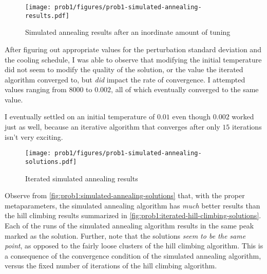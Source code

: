 \documentclass{article}
\begin{document}
\begin{figure}[H]
    \centering
    \texttt{[image: prob1/figures/prob1-simulated-annealing-results.pdf]}
    \caption{Simulated annealing results after an inordinate amount of
        tuning}\label{fig:prob1:simulated-annealing-results}
\end{figure}

After figuring out appropriate values for the perturbation standard deviation and the cooling
schedule, I was able to observe that modifying the initial temperature did not seem to modify the
quality of the solution, or the value the iterated algorithm converged to, but \textit{did} impact
the rate of convergence. I attempted values ranging from $8000$ to $0.002$, all of which eventually
converged to the same value.

I eventually settled on an initial temperature of $0.01$ even though $0.002$ worked just as well,
because an iterative algorithm that converges after only $15$ iterations isn't very exciting.

\begin{figure}[h]
    \centering
    \texttt{[image: prob1/figures/prob1-simulated-annealing-solutions.pdf]}
    \caption{Iterated simulated annealing results}\label{fig:prob1:simulated-annealing-solutions}
\end{figure}

Observe from \autoref{fig:prob1:simulated-annealing-solutions} that, with the proper
metaparameters, the simulated annealing algorithm has \textit{much} better results than the hill
climbing results summarized in \autoref{fig:prob1:iterated-hill-climbing-solutions}. Each of the
runs of the simulated annealing algorithm results in the same peak marked as the solution. Further,
note that the solutions \textit{seem to be the same point}, as opposed to the fairly loose clusters
of the hill climbing algorithm. This is a consequence of the convergence condition of the simulated
annealing algorithm, versus the fixed number of iterations of the hill climbing algorithm.
\end{document}
